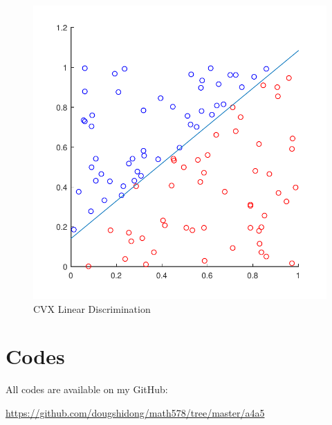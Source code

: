 \documentclass[letterpaper,12pt,]{article}
\begin{document}
\begin{figure}[h]
    \centering
    \includegraphics[height=0.35\textheight]{ld1}
    \caption{CVX Linear Discrimination}
    \label{fig:ld}
\end{figure}

\section*{Codes}

All codes are available on my GitHub:

\url{https://github.com/dougshidong/math578/tree/master/a4a5}
\end{document}
